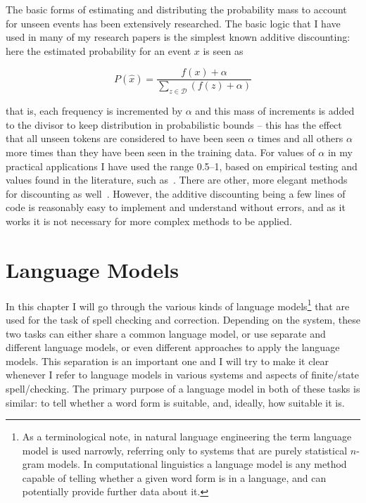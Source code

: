\documentclass[officiallayout,final]{unihelcompling}
\begin{document}
The basic forms of estimating and distributing the probability mass to account
for unseen events has been extensively researched. The basic logic that I have
used in many of my research papers is the simplest known additive discounting:
here the estimated probability for an event $x$ is seen as

\begin{equation}
    P(\hat{x}) = \frac{f(x) + \alpha}{\sum_{z \in \mathcal{D}}(f(z) + \alpha)}
\end{equation}

that is, each frequency is incremented by $\alpha$ and this mass
of increments is added to the divisor to keep distribution in probabilistic
bounds -- this has the effect that all unseen tokens are considered to have been
seen $\alpha$ times and all others $\alpha$ more times than they have been seen
in the training data.  For values of $\alpha$ in my practical applications I
have used the range 0.5--1, based on empirical testing and values found in the
literature, such as~\citet{manning1999foundations}. There are other, more
elegant methods for discounting as well~\citep{chen1999empirical}. However,
the additive discounting being a few lines of code is reasonably easy to
implement and understand without errors, and as it works it is not necessary
for more complex methods to be applied.


\chapter{Language Models}
\label{chap:language-models}

In this chapter I will go through the various kinds of
\glspl{language model}\footnote{As a terminological note, in \gls{natural language
    engineering} the term language model is used narrowly, referring only
    to systems that are purely statistical \(n\)-gram models. In
    computational linguistics a language model is any method capable of
    telling whether a given word form is in a language, and can potentially
    provide further data about it.} that are
used for the task of spell checking and correction.  Depending on the system,
these two tasks can either share a common language model, or use separate and
different language models, or even different approaches to apply the language
models. This separation is an important one and I will try to make it clear
whenever I refer to language models in various systems and aspects of
finite\-/state spell\-/checking.  The primary purpose of a language model in
both of these tasks is similar: to tell whether a word form is suitable, and,
ideally, how suitable it is.
\end{document}
